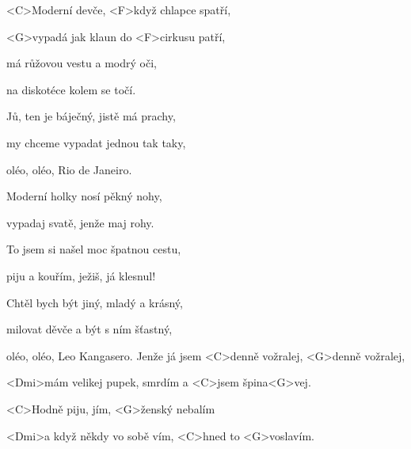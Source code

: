 
\zs
<C>Moderní devče, <F>když chlapce spatří,

<G>vypadá jak klaun do <F>cirkusu patří,

má růžovou vestu a modrý oči,

na diskotéce kolem se točí.

Jů, ten je báječný, jistě má prachy,

my chceme vypadat jednou tak taky,

oléo, oléo, Rio de Janeiro.
\ks

\zs
Moderní holky nosí pěkný nohy,

vypadaj svatě, jenže maj rohy.

To jsem si našel moc špatnou cestu,

piju a kouřím, ježiš, já klesnul!

Chtěl bych být jiný, mladý a krásný,

milovat děvče a být s ním šťastný,

oléo, oléo, Leo Kangasero.
\ks
\zr
Jenže já jsem <C>denně vožralej, <G>denně vožralej,

<Dmi>mám velikej pupek, smrdím a <C>jsem špina<G>vej.

<C>Hodně piju, jím, <G>ženský nebalím

<Dmi>a když někdy vo sobě vím, <C>hned to <G>voslavím.
\kr

\zr\kr
\kp




